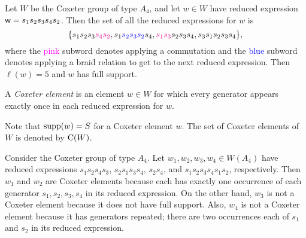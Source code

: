 \begin{example} Let $W$ be the Coxeter group of type $A_4$, and let $w \in W$ have reduced expression $\mathsf{w} = s_1s_2s_3s_4s_2$. Then the set of all the reduced expressions for $w$ is
    $$\{s_1s_2s_3\textcolor{magenta}{s_4s_2}, s_1\textcolor{blue}{s_2s_3s_2}s_4, \textcolor{magenta}{s_1s_3}s_2s_3s_4, s_3s_1s_2s_3s_4\},$$
    where the \textcolor{magenta}{pink} subword denotes applying a commutation and the \textcolor{blue}{blue} subword denotes applying a braid relation to get to the next reduced expression. Then $\ell(w) = 5$ and $w$ has full support.
\end{example}
    
\begin{definition} A \emph{Coxeter element} is an element $w \in W$ for which every generator appears exactly once in each reduced expression for $w$. 
\end{definition}

    Note that $\operatorname{supp}(w) = S$ for a Coxeter element $w$. The set of Coxeter elements of $W$ is denoted by $\operatorname{\mathrm{C}}(W)$.
    
\begin{example} \label{ex:Coxelt} Consider the Coxeter group of type $A_4$. Let $w_1, w_2, w_3, w_4 \in W(A_4)$ have reduced expressions $s_1s_2s_4s_3$, $s_2s_1s_3s_4$, $s_2s_4$, and $s_1s_2s_3s_4s_1s_2$, respectively.
    Then $w_1$ and $w_2$ are Coxeter elements because each has exactly one occurrence of each generator $s_1,s_2,s_3,s_4$ in its reduced expression.
    On the other hand, $w_3$ is not a Coxeter element because it does not have full support. Also, $w_4$ is not a Coxeter element because it has generators repeated; there are two occurrences each of $s_1$ and $s_2$ in its reduced expression.
\end{example}

